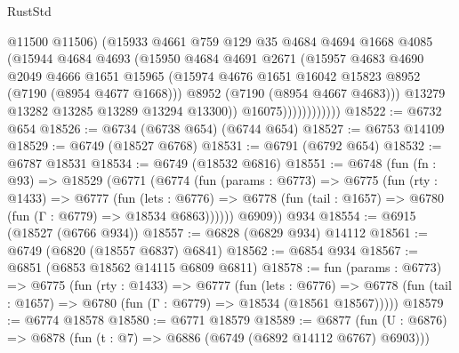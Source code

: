 \begin{lexlean}{RustStd}
\begin{coremodule}
                            @11500
                            @11506)
                          (@15933
                            @4661
                            @759
                            @129
                            @35
                            @4684
                            @4694
                            @1668
                            @4085
                            (@15944
                              @4684
                              @4693
                              (@15950
                                @4684
                                @4691
                                @2671
                                (@15957
                                  @4683
                                  @4690
                                  @2049
                                  @4666
                                  @1651
                                  @15965
                                  (@15974
                                    @4676
                                    @1651
                                    @16042
                                    @15823
                                    @8952
                                    (@7190 (@8954 @4677 @1668)))
                                  @8952
                                  (@7190 (@8954 @4667 @4683)))
                                @13279
                                @13282
                                @13285
                                @13289
                                @13294
                                @13300))
                            @16075))))))))))))
@18522 := @6732 @654
@18526 := @6734 (@6738 @654) (@6744 @654)
@18527 := @6753 @14109
@18529 := @6749 (@18527 @6768)
@18531 := @6791 (@6792 @654)
@18532 := @6787 @18531
@18534 := @6749 (@18532 @6816)
@18551 := @6748
    (fun (fn : @93) =>
    @18529
      (@6771
        (@6774
          (fun (params : @6773) =>
          @6775
            (fun (rty : @1433) =>
            @6777
              (fun (lets : @6776) =>
              @6778 (fun (tail : @1657) => @6780 (fun (Γ : @6779) => @18534 @6863))))))
        @6909))
    @934
@18554 := @6915 (@18527 (@6766 @934))
@18557 := @6828 (@6829 @934) @14112
@18561 := @6749 (@6820 (@18557 @6837) @6841)
@18562 := @6854 @934
@18567 := @6851 (@6853 @18562 @14115 @6809 @6811)
@18578 := fun (params : @6773) =>
  @6775
    (fun (rty : @1433) =>
    @6777
      (fun (lets : @6776) =>
      @6778 (fun (tail : @1657) => @6780 (fun (Γ : @6779) => @18534 (@18561 @18567)))))
@18579 := @6774 @18578
@18580 := @6771 @18579
@18589 := @6877
    (fun (U : @6876) => @6878 (fun (t : @7) => @6886 (@6749 (@6892 @14112 @6767) @6903)))

\end{coremodule}
\end{lexlean}
